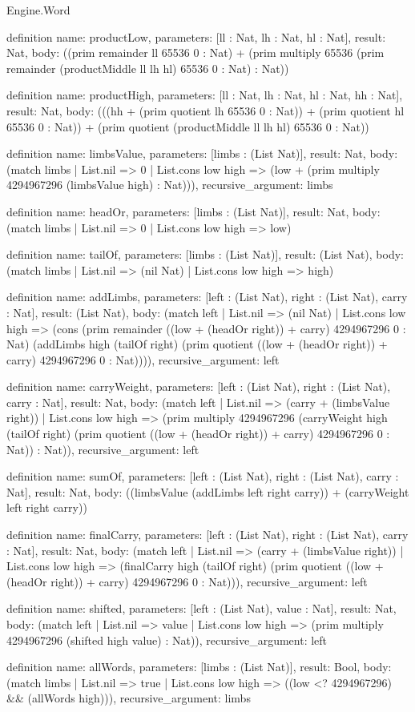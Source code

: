 \begin{lexlean}{Engine.Word}
\begin{semanticmodule}
definition{
  name: productLow,
  parameters: [ll : Nat, lh : Nat, hl : Nat],
  result: Nat,
  body: ((prim remainder ll 65536 0 : Nat) + (prim multiply 65536 (prim remainder (productMiddle ll lh hl) 65536 0 : Nat) : Nat))
}

definition{
  name: productHigh,
  parameters: [ll : Nat, lh : Nat, hl : Nat, hh : Nat],
  result: Nat,
  body: (((hh + (prim quotient lh 65536 0 : Nat)) + (prim quotient hl 65536 0 : Nat)) + (prim quotient (productMiddle ll lh hl) 65536 0 : Nat))
}

definition{
  name: limbsValue,
  parameters: [limbs : (List Nat)],
  result: Nat,
  body: (match limbs
    | List.nil => 0
    | List.cons low high => (low + (prim multiply 4294967296 (limbsValue high) : Nat))),
  recursive_argument: limbs
}

definition{
  name: headOr,
  parameters: [limbs : (List Nat)],
  result: Nat,
  body: (match limbs | List.nil => 0 | List.cons low high => low)
}

definition{
  name: tailOf,
  parameters: [limbs : (List Nat)],
  result: (List Nat),
  body: (match limbs | List.nil => (nil Nat) | List.cons low high => high)
}

definition{
  name: addLimbs,
  parameters: [left : (List Nat), right : (List Nat), carry : Nat],
  result: (List Nat),
  body: (match left
    | List.nil => (nil Nat)
    | List.cons low high => (cons (prim remainder ((low + (headOr right)) + carry) 4294967296 0 : Nat) (addLimbs high (tailOf right) (prim quotient ((low + (headOr right)) + carry) 4294967296 0 : Nat)))),
  recursive_argument: left
}

definition{
  name: carryWeight,
  parameters: [left : (List Nat), right : (List Nat), carry : Nat],
  result: Nat,
  body: (match left
    | List.nil => (carry + (limbsValue right))
    | List.cons low high => (prim multiply 4294967296 (carryWeight high (tailOf right) (prim quotient ((low + (headOr right)) + carry) 4294967296 0 : Nat)) : Nat)),
  recursive_argument: left
}

definition{
  name: sumOf,
  parameters: [left : (List Nat), right : (List Nat), carry : Nat],
  result: Nat,
  body: ((limbsValue (addLimbs left right carry)) + (carryWeight left right carry))
}

definition{
  name: finalCarry,
  parameters: [left : (List Nat), right : (List Nat), carry : Nat],
  result: Nat,
  body: (match left
    | List.nil => (carry + (limbsValue right))
    | List.cons low high => (finalCarry high (tailOf right) (prim quotient ((low + (headOr right)) + carry) 4294967296 0 : Nat))),
  recursive_argument: left
}

definition{
  name: shifted,
  parameters: [left : (List Nat), value : Nat],
  result: Nat,
  body: (match left
    | List.nil => value
    | List.cons low high => (prim multiply 4294967296 (shifted high value) : Nat)),
  recursive_argument: left
}

definition{
  name: allWords,
  parameters: [limbs : (List Nat)],
  result: Bool,
  body: (match limbs
    | List.nil => true
    | List.cons low high => ((low <? 4294967296) && (allWords high))),
  recursive_argument: limbs
}
\end{semanticmodule}
\end{lexlean}
